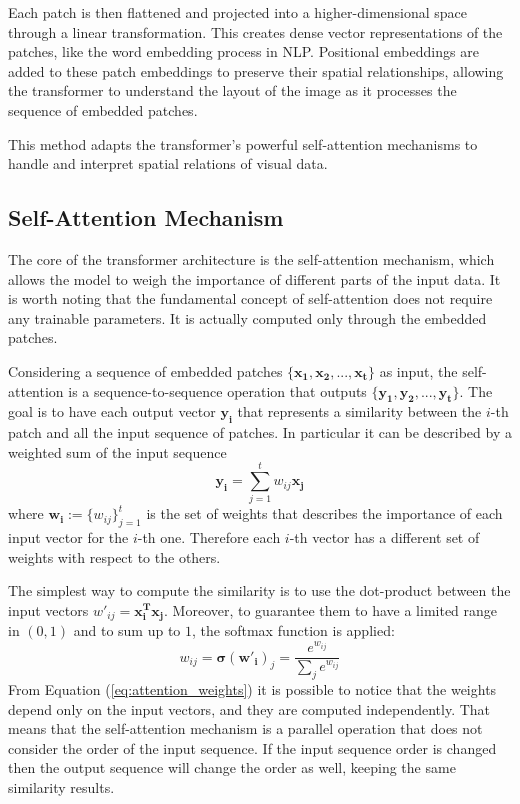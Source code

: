 Each patch is then flattened and projected into a higher-dimensional space 
through a linear transformation. This creates dense vector representations of 
the patches, like the word embedding process in NLP. 
Positional embeddings are added to these patch embeddings to preserve their 
spatial relationships, allowing the transformer to understand the layout of the 
image as it processes the sequence of embedded patches. 

This method adapts the transformer's powerful self-attention mechanisms to 
handle and interpret spatial relations of visual data.


\subsection{Self-Attention Mechanism}
The core of the transformer architecture is the self-attention mechanism, which 
allows the model to weigh the importance of different parts of the input data.
It is worth noting that the fundamental concept of self-attention does not 
require any trainable parameters. It is actually computed only through the 
embedded patches.

Considering a sequence of embedded patches $\{\boldsymbol{x_1, x_2, ..., x_t}\}$ 
as input, the self-attention is a sequence-to-sequence operation that outputs
$\{\boldsymbol{y_1, y_2, ..., y_t}\}$. The goal is to have each output vector 
$\boldsymbol{y_i}$ that represents a similarity between the $i$-th 
patch and all the input sequence of patches. In particular it can be described by a  
weighted sum of the input sequence
\begin{equation}
\boldsymbol{y_i} = \sum_{j=1}^{t} w_{ij} \boldsymbol{x_j}
\label{eq:self_attention_output}
\end{equation}
where $\boldsymbol{w_i}:=\{w_{ij}\}_{j=1}^t$ is the set of weights that describes the importance 
of each input vector for the $i$-th one. 
Therefore each $i$-th vector has a different set of weights with respect to 
the others.

The simplest way to compute the similarity is to use the dot-product between the 
input vectors $w'_{ij} = \boldsymbol{x_i^T x_j}$. Moreover, to guarantee them to have a limited 
range in $(0, 1)$ and to sum up to $1$, the softmax function is applied:
\begin{equation}
    w_{ij} = \boldsymbol{\sigma}(\boldsymbol{w'_i})_j = 
    \frac{e^{w_{ij}}}{\sum_{j} e^{w_{ij}}}
    \label{eq:attention_weights}
\end{equation}
From Equation (\ref{eq:attention_weights}) it is possible to notice that the 
weights depend only on the input vectors, and they are computed independently. 
That means that the self-attention mechanism is a parallel operation that does 
not consider the order of the input sequence. If the input sequence order is 
changed then the output sequence will change the order as well, keeping the 
same similarity results.

